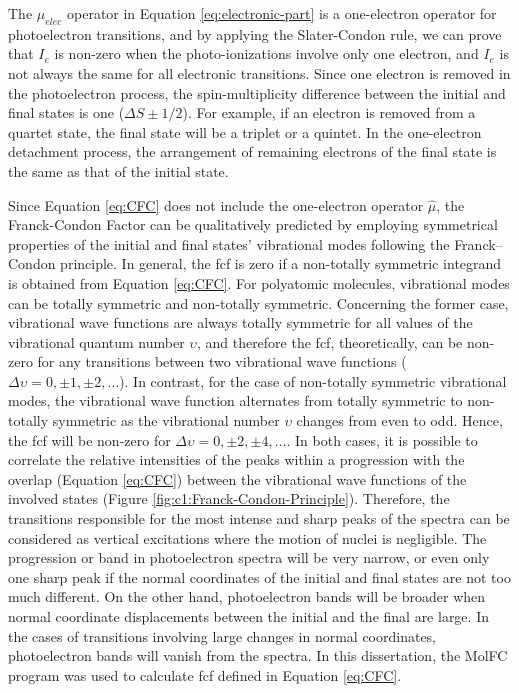 \begin{refsection}
The $\hat{\mu}_{elec}$ operator in Equation \ref{eq:electronic-part} is a one-electron operator for photoelectron transitions, and by applying the Slater-Condon rule,\cite{c1:21:Piela2014} we can prove that $I_e$ is non-zero when the photo-ionizations involve only one electron, and $I_e$ is not always the same for all electronic transitions. Since one electron is removed in the photoelectron process, the spin-\-mul\-tiplicity difference between the initial and final states is one ($\Delta S \pm 1/2$). For example, if an electron is removed from a quartet state, the final state will be a triplet or a quintet. In the one-electron detachment process, the arrangement of remaining electrons of the final state is the same as that of the initial state.




Since Equation \ref{eq:CFC} does not include the one-electron operator $\hat{\mu}$, the Franck-Condon Factor can be qualitatively predicted by employing symmetrical properties of the initial and final states' vibrational modes following the Franck–Condon principle. In general, the \acrshort{fcf} is zero if a non-totally symmetric integrand is obtained from Equation \ref{eq:CFC}. For polyatomic molecules, vibrational modes can be totally symmetric and non-totally symmetric. Concerning the former case, vibrational wave functions are always totally symmetric for all values of the vibrational quantum number $\upsilon$, and therefore the \acrshort{fcf}, theoretically, can be non-zero for any transitions between two vibrational wave functions ($\Delta\upsilon = 0, \pm1, \pm2, \ldots$). In contrast, for the case of non-totally symmetric vibrational modes, the vibrational wave function alternates from totally symmetric to non-totally symmetric as the vibrational number $\upsilon$ changes from even to odd. Hence, the \acrshort{fcf} will be non-zero for $\Delta\upsilon = 0, \pm2, \pm4, \ldots$. In both cases, it is possible to correlate the relative intensities of the peaks within a progression with the overlap (Equation \ref{eq:CFC}) between the vibrational wave functions of the involved states (Figure \ref{fig:c1:Franck-Condon-Principle}). Therefore, the transitions responsible for the most intense and sharp peaks of the spectra can be considered as vertical excitations where the motion of nuclei is negligible. The progression or band in photoelectron spectra will be very narrow, or even only one sharp peak if the normal coordinates of the initial and final states are not too much different. On the other hand, photoelectron bands will be broader when normal coordinate displacements between the initial and the final are large. In the cases of transitions involving large changes in normal coordinates, photoelectron bands will vanish from the spectra. In this dissertation, the MolFC program \cite{c2:molfc} was used to calculate \acrshort{fcf} defined in Equation \ref{eq:CFC}. 




\end{refsection}
